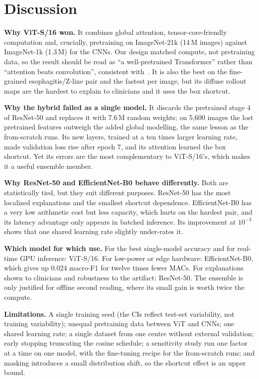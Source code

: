 \documentclass[conference]{IEEEtran}
\begin{document}
\section{Discussion}
\textbf{Why ViT-S/16 won.} It combines global attention, tensor-core-friendly computation and, crucially, pretraining on
ImageNet-21k (14\,M images) against ImageNet-1k (1.3\,M) for the CNNs. Our design matched compute, not pretraining
data, so the result should be read as ``a well-pretrained Transformer'' rather than ``attention beats convolution'',
consistent with~\cite{matsoukas2021time}. It is also the best on the fine-grained esophagitis/Z-line pair and the
fastest per image, but its diffuse rollout maps are the hardest to explain to clinicians and it uses the box shortcut.

\textbf{Why the hybrid failed as a single model.} It discards the pretrained stage 4 of ResNet-50 and replaces it with
7.6\,M random weights; on 5{,}600 images the lost pretrained features outweigh the added global modelling, the same
lesson as the from-scratch runs. Its new layers, trained at a ten times larger learning rate, made validation loss rise
after epoch 7, and its attention learned the box shortcut. Yet its errors are the most complementary to ViT-S/16's,
which makes it a useful ensemble member.

\textbf{Why ResNet-50 and EfficientNet-B0 behave differently.} Both are statistically tied, but they suit different
purposes. ResNet-50 has the most localized explanations and the smallest shortcut dependence. EfficientNet-B0 has a
very low arithmetic cost but less capacity, which hurts on the hardest pair, and its latency advantage only appears in
batched inference. Its improvement at $10^{-3}$ shows that one shared learning rate slightly under-rates it.

\textbf{Which model for which use.} For the best single-model accuracy and for real-time GPU inference: ViT-S/16. For
low-power or edge hardware: EfficientNet-B0, which gives up 0.024 macro-F1 for twelve times fewer MACs. For explanations
shown to clinicians and robustness to the artifact: ResNet-50. The ensemble is only justified for offline second
reading, where its small gain is worth twice the compute.

\textbf{Limitations.} A single training seed (the CIs reflect test-set variability, not training variability);
unequal pretraining data between ViT and CNNs; one shared learning rate; a single dataset from one centre without
external validation; early stopping truncating the cosine schedule; a sensitivity study run one factor at a time on
one model, with the fine-tuning recipe for the from-scratch runs; and masking introduces a small distribution shift,
so the shortcut effect is an upper bound.
\end{document}
